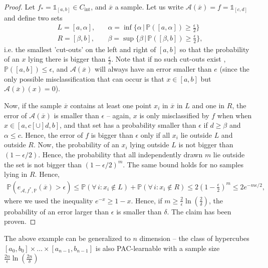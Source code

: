 \documentclass{article}
\newcommand{\calA}{\mathcal{A}}
\newcommand{\one}{\mathds{1}}
\begin{document}
\begin{proof}
    Let $f_*= \one_{[a,b]} \in C_{\mathrm{int}}$, and $\overline{x}$ a sample.  Let us write $\mathcal{A}(\overline{x})=f=\one_{[c,d]}$ and define two sets
    \begin{align*}
        L = [a,\alpha], &\quad \alpha = \inf \{\alpha \, \vert \,  \mathbb{P}([a,\alpha])\geq \frac{\epsilon}{2}\} \\
        R = [\beta, b], &\quad \beta = \sup \{ \beta \, \vert \, \mathbb{P}([\beta,b])\geq \frac{\epsilon}{2}\},
    \end{align*}
    i.e. the smallest 'cut-outs' on the left and right of $[a,b]$ so that the probability of an $x$ lying there is bigger than $\frac{\epsilon}{2}$. Note that if no such cut-outs exist , $\mathbb{P}([a,b])\leq \epsilon$, and $\calA(\overline{x})$ will always have an error smaller than $e$ (since the only possible misclassification that can occur is that $x \in [a,b]$ but $\calA(\overline{x})(x)=0$). 

    Now, if the sample $\overline{x}$ contains at least one point $x_i$ in $\overline{x}$ in $L$ and one in $R$, the error of $\calA(\overline{x})$ is smaller than $\epsilon$ -- again,  $x$ is only misclassified by $f$ when when $x\in [a,c[ \cup ]d,b]$, and that set has a probability smaller than $\epsilon$ if $d\geq \beta$ and $\alpha\leq c$. Hence, the error of $f$ is bigger than $\epsilon$ only if all $x_i$ lie outside $L$ and outside $R$. Now, the probability of an $x_i$ lying outside $L$ is not bigger than $(1-\epsilon/2)$. Hence, the probability that all independently drawn $m$ lie outside the set is not bigger than $(1-\epsilon/2)^m$. The same bound holds for no samples lying in $R$. Hence, 
    \begin{align*}
        \mathbb{P}({e_{\calA,f^*,\mathbb{P}}}(\overline{x})>\epsilon) \leq \mathbb{P}(\forall \, i : x_i \notin L)  + \mathbb{P}(\forall \, i : x_i \notin R) \leq 2\left(1-\tfrac{\epsilon}{2}\right)^m\leq 2e^{-m\epsilon/2},
    \end{align*}
    where we used the inequality $e^{-x}\geq 1-x$. Hence, if $m\geq \tfrac{2}{\epsilon}\ln(\tfrac{2}{\delta})$, the probability of an error larger than $\epsilon$ is smaller than $\delta$. The claim has been proven.
\end{proof}
The above example can be generalized to  $n$ dimension -- the class of hypercubes $[a_0,b_0] \times \dots \times [a_{n-1},b_{n-1}]$ is also PAC-learnable with a sample size $\tfrac{2n}{\epsilon}\ln(\tfrac{2n}{\delta})$
\end{document}

